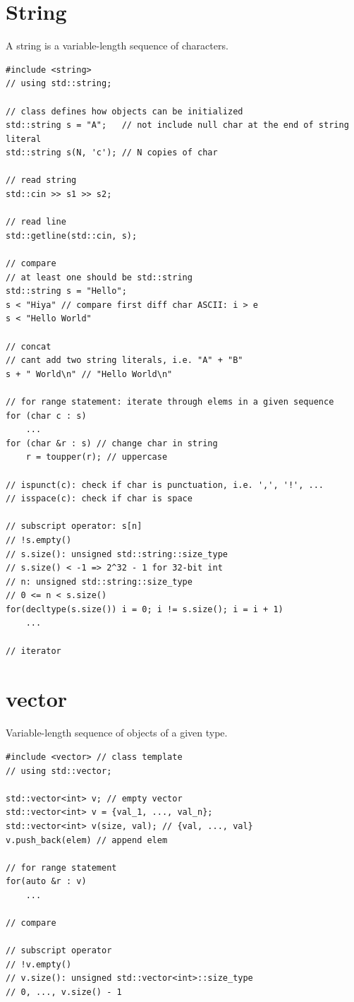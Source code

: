 \documentclass{blog}
\begin{document}
\section{String}
\begin{definition}[string]
    A string is a variable-length sequence of characters.
    \begin{verbatim}
#include <string>
// using std::string;

// class defines how objects can be initialized
std::string s = "A";   // not include null char at the end of string literal
std::string s(N, 'c'); // N copies of char

// read string
std::cin >> s1 >> s2;

// read line
std::getline(std::cin, s);

// compare
// at least one should be std::string
std::string s = "Hello";
s < "Hiya" // compare first diff char ASCII: i > e
s < "Hello World"

// concat
// cant add two string literals, i.e. "A" + "B"
s + " World\n" // "Hello World\n"

// for range statement: iterate through elems in a given sequence
for (char c : s)
    ...
for (char &r : s) // change char in string
    r = toupper(r); // uppercase

// ispunct(c): check if char is punctuation, i.e. ',', '!', ...
// isspace(c): check if char is space

// subscript operator: s[n]
// !s.empty()
// s.size(): unsigned std::string::size_type
// s.size() < -1 => 2^32 - 1 for 32-bit int
// n: unsigned std::string::size_type
// 0 <= n < s.size()
for(decltype(s.size()) i = 0; i != s.size(); i = i + 1)
    ...

// iterator
\end{verbatim}
\end{definition}

\section{vector}
\begin{definition}[vector]
    Variable-length sequence of objects of a given type.
    \begin{verbatim}
#include <vector> // class template
// using std::vector;

std::vector<int> v; // empty vector
std::vector<int> v = {val_1, ..., val_n};
std::vector<int> v(size, val); // {val, ..., val}
v.push_back(elem) // append elem

// for range statement
for(auto &r : v)
    ...

// compare

// subscript operator
// !v.empty()
// v.size(): unsigned std::vector<int>::size_type
// 0, ..., v.size() - 1
\end{verbatim}
\end{definition}
\end{document}
